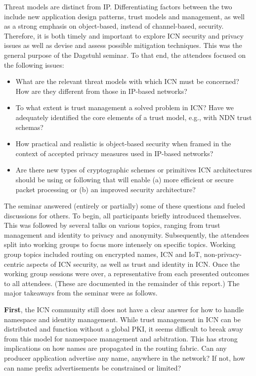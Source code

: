 \documentclass[a4paper,UKenglish]{dagrep}
\begin{document}
Threat models are distinct from IP. Differentiating factors between the two include new application design patterns, trust models and management, as well as a strong emphasis on object-based, instead of channel-based, security. Therefore, it is both timely and important to explore ICN security and privacy issues as well as devise and assess possible mitigation techniques. This was the general purpose of the Dagstuhl seminar. To that end, the attendees focused on the following issues:
%
\begin{itemize}
\item What are the relevant threat models with which ICN must be concerned? How are they different from those in IP-based networks?
\item To what extent is trust management a solved problem in ICN? Have we adequately identified the core elements of a trust model, e.g., with NDN trust schemas?
\item How practical and realistic is object-based security when framed in the context of accepted privacy measures used in IP-based networks?
\item Are there new types of cryptographic schemes or primitives ICN architectures should be using or following that will enable (a) more efficient or secure packet processing or (b) an improved security architecture?
\end{itemize}
%
The seminar answered (entirely or partially) some of these questions and fueled discussions for others. To begin, all participants briefly introduced themselves. This was followed by several talks on various topics, ranging from trust management and identity to privacy and anonymity. Subsequently, the attendees split into working groups to focus more intensely on specific topics. Working group topics included routing on encrypted names, ICN and IoT, non-privacy-centric aspects of ICN security, as well as trust and identity in ICN.
Once the working group sessions were over, a representative from each presented outcomes to all attendees. (These are documented in the remainder of this report.) The major takeaways from the seminar were as follows.

{\bf First}, the ICN community still does not have a clear answer for how to handle namespace and identity management. While trust management in ICN can be distributed and function without a global PKI, it seems difficult to break away from this model for namespace management and arbitration. This has strong implications on how names are propagated in the routing fabric. Can any producer application advertise any name, anywhere in the network? If not, how can name prefix advertisements be constrained or limited?
\end{document}
